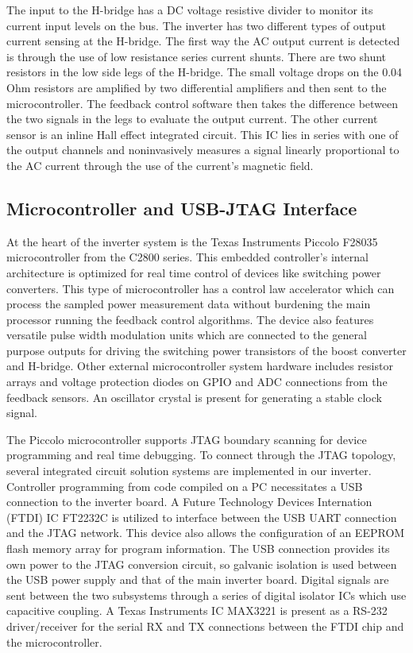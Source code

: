 The input to the H-bridge has a DC voltage resistive divider to monitor its current input levels on the bus. The inverter has two different types of output current sensing at the H-bridge. The first way the AC output current is detected is through the use of low resistance series current shunts. There are two shunt resistors in the low side legs of the H-bridge. The small voltage drops on the 0.04 Ohm resistors are amplified by two differential amplifiers and then sent to the microcontroller. The feedback control software then takes the difference between the two signals in the legs to evaluate the output current. The other current sensor is an inline Hall effect integrated circuit. This IC lies in series with one of the output channels and noninvasively measures a signal linearly proportional to the AC current through the use of the current’s magnetic field.



\subsection{Microcontroller and USB-JTAG Interface}
 At the heart of the inverter system is the Texas Instruments Piccolo F28035 microcontroller from the C2800 series. This embedded controller's internal architecture is optimized for real time control of devices like switching power converters. This type of microcontroller has a control law accelerator which can process the sampled power measurement data without burdening the main processor running the feedback control algorithms. The device also features versatile pulse width modulation units which are connected to the general purpose outputs for driving the switching power transistors of the boost converter and H-bridge. Other external microcontroller system hardware includes resistor arrays and voltage protection diodes on GPIO and ADC connections from the feedback sensors. An oscillator crystal is present for generating a stable clock signal.

The Piccolo microcontroller supports JTAG boundary scanning for device programming and real time debugging. To connect through the JTAG topology, several integrated circuit solution systems are implemented in our inverter. Controller programming from code compiled on a PC necessitates a USB connection to the inverter board. A Future Technology Devices Internation (FTDI) IC FT2232C is utilized to interface between the USB UART connection and the JTAG network. This device also allows the configuration of an EEPROM flash memory array for program information. The USB connection provides its own power to the JTAG conversion circuit, so galvanic isolation is used between the USB power supply and that of the main inverter board. Digital signals are sent between the two subsystems through a series of digital isolator ICs which use capacitive coupling. A Texas Instruments IC MAX3221 is present as a RS-232 driver/receiver for the serial RX and TX connections between the FTDI chip and the microcontroller.

